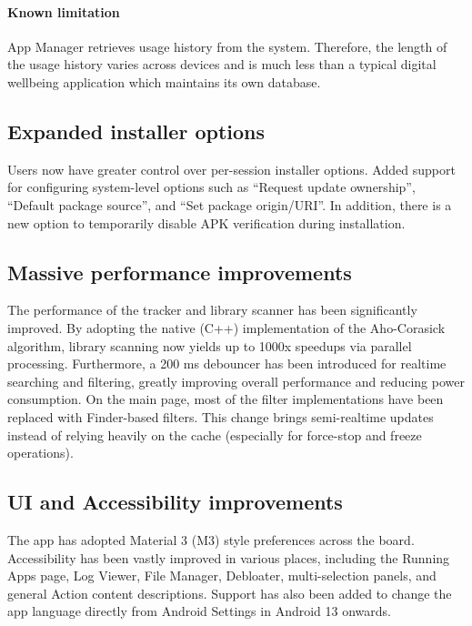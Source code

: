 \paragraph{Known limitation} App Manager retrieves usage history from the system. Therefore, the
length of the usage history varies across devices and is much less than a typical digital wellbeing
application which maintains its own database.

\subsection{Expanded installer options}
Users now have greater control over per-session installer options. Added support for configuring
system-level options such as ``Request update ownership'', ``Default package source'', and
``Set package origin/URI''. In addition, there is a new option to temporarily disable APK
verification during installation.

\subsection{Massive performance improvements}
The performance of the tracker and library scanner has been significantly improved. By adopting the
native (C++) implementation of the Aho-Corasick algorithm, library scanning now yields up to 1000x
speedups via parallel processing. Furthermore, a 200 ms debouncer has been introduced for realtime
searching and filtering, greatly improving overall performance and reducing power consumption. On
the main page, most of the filter implementations have been replaced with Finder-based filters.
This change brings semi-realtime updates instead of relying heavily on the cache (especially for
force-stop and freeze operations).

\subsection{UI and Accessibility improvements}
The app has adopted Material 3 (M3) style preferences across the board. Accessibility has been
vastly improved in various places, including the Running Apps page, Log Viewer, File Manager,
Debloater, multi-selection panels, and general Action content descriptions. Support has also been
added to change the app language directly from Android Settings in Android 13 onwards.

